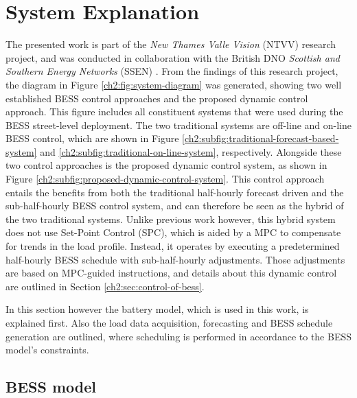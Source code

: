 \section{System Explanation}
\label{ch2:sec:system-explanation}



The presented work is part of the \textit{New Thames Valle Vision} (NTVV) research project, and was conducted in collaboration with the British DNO \textit{Scottish and Southern Energy Networks} (SSEN) \cite{NTVV2016}.
From the findings of this research project, the diagram in Figure \ref{ch2:fig:system-diagram} was generated, showing two well established BESS control approaches and the proposed dynamic control approach.
This figure includes all constituent systems that were used during the BESS street-level deployment.
The two traditional systems are off-line and on-line BESS control, which are shown in Figure \ref{ch2:subfig:traditional-forecast-based-system} and \ref{ch2:subfig:traditional-on-line-system}, respectively.
Alongside these two control approaches is the proposed dynamic control system, as shown in Figure \ref{ch2:subfig:proposed-dynamic-control-system}.
This control approach entails the benefits from both the traditional half-hourly forecast driven and the sub-half-hourly BESS control system, and can therefore be seen as the hybrid of the two traditional systems.
Unlike previous work however, this hybrid system does not use Set-Point Control (SPC), which is aided by a MPC to compensate for trends in the load profile.
Instead, it operates by executing a predetermined half-hourly BESS schedule with sub-half-hourly adjustments.
Those adjustments are based on MPC-guided instructions, and details about this dynamic control are outlined in Section \ref{ch2:sec:control-of-bess}.

In this section however the battery model, which is used in this work, is explained first.
Also the load data acquisition, forecasting and BESS schedule generation are outlined, where scheduling is performed in accordance to the BESS model's constraints.

\subsection{BESS model}

